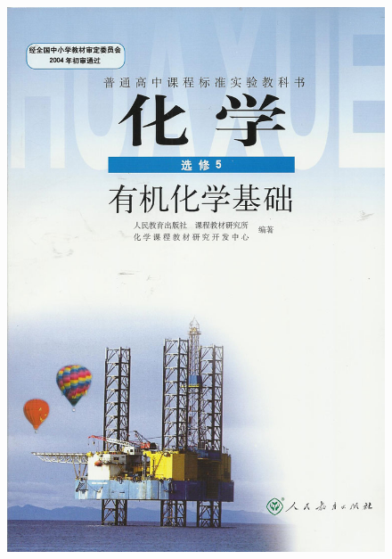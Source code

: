 \documentclass[CJK]{beamer}
\begin{document}
\begin{frame}
\begin{figure}[h!]
\includegraphics[scale=0.13]{chem5}
\end{figure}
\ech
\end{frame}
\end{document}

